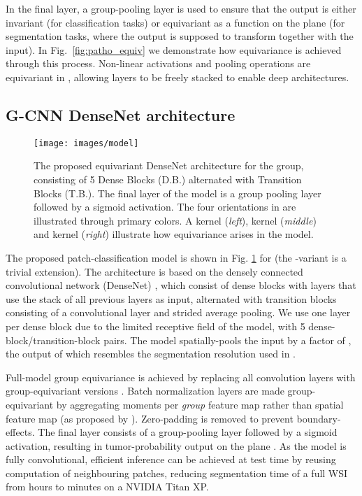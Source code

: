 \documentclass{llncs}
\begin{document}
In the final layer, a group-pooling layer is used to ensure that the output is either invariant (for classification tasks) or equivariant as a function on the plane (for segmentation tasks, where the output is supposed to transform together with the input). In Fig.~\ref{fig:patho_equiv} we demonstrate how equivariance is achieved through this process. Non-linear activations and pooling operations are equivariant in \cite{Cohen2016-do}, allowing layers to be freely stacked to enable deep architectures.

\subsection{G-CNN DenseNet architecture}
\begin{figure}[t]
\centerline{\texttt{[image: images/model]}}

\caption{The proposed equivariant DenseNet architecture for the  group, consisting of 5 Dense Blocks (D.B.) alternated with Transition Blocks (T.B.). The final layer of the model is a  group pooling layer followed by a sigmoid activation. The four orientations in  are illustrated through primary colors. A  kernel (\textit{left}),  kernel (\textit{middle}) and  kernel (\textit{right}) illustrate how equivariance arises in the model.}\label{fig:model}
\end{figure}
The proposed patch-classification model is shown in Fig. \ref{fig:model} for  (the -variant is a trivial extension). The architecture is based on the densely connected convolutional network (DenseNet) \cite{Huang2016-dq}, which consist of dense blocks with layers that use the stack of all previous layers as input, alternated with transition blocks consisting of a  convolutional layer and  strided average pooling. We use one layer per dense block due to the limited receptive field of the model, with 5 dense-block/transition-block pairs. The model spatially-pools the input by a factor of , the output of which resembles the segmentation resolution used in \cite{Liu2017-jq}. 

Full-model group equivariance is achieved by replacing all convolution layers with group-equivariant versions \cite{Cohen2016-do}. Batch normalization layers\cite{Ioffe2015-ib} are made group-equivariant by aggregating moments per \textit{group} feature map rather than spatial feature map (as proposed by \cite{Cohen2016-do}). Zero-padding is removed to prevent boundary-effects. The final layer consists of a group-pooling layer followed by a sigmoid activation, resulting in tumor-probability output on the plane . As the model is fully convolutional, efficient inference can be achieved at test time by reusing computation of neighbouring patches, reducing segmentation time of a full WSI from hours to  minutes on a NVIDIA Titan XP.
\end{document}

